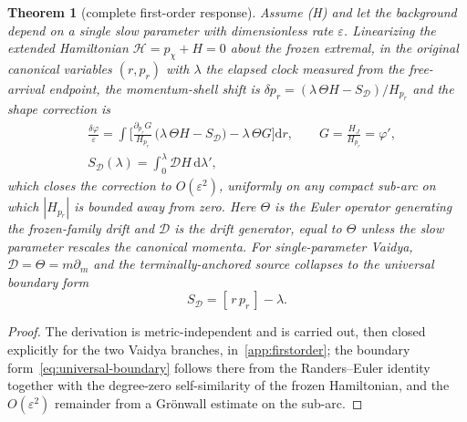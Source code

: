 \documentclass[12pt]{iopart}
\newcommand{\dd}{\mathrm{d}}
\theoremstyle{plain}
\newtheorem{theorem}{Theorem}
\theoremstyle{definition}
\theoremstyle{plain}
\theoremstyle{remark}
\newcommand{\Ithm}[1]{\setcounter{theorem}{\numexpr#1-1\relax}}
\begin{document}
\Ithm{5}
\begin{theorem}[complete first-order response]\label{thm:firstorder}
Assume (H) and let the background depend on a single slow parameter with dimensionless
rate $\varepsilon$. Linearizing the extended Hamiltonian $\mathcal H=p_\chi+H=0$ about the
frozen extremal, in the original canonical variables $(r,p_r)$ with $\lambda$ the elapsed
clock measured from the free-arrival endpoint, the momentum-shell shift is
$\delta p_r=(\lambda\,\Theta H-S_{\mathcal D})/H_{p_r}$ and the shape correction is
\begin{equation}
    \begin{aligned}
    &\frac{\delta\varphi}{\varepsilon}=\int\!\Big[\frac{\partial_{p_r}G}{H_{p_r}}\,
    \big(\lambda\,\Theta H-S_{\mathcal D}\big)-\lambda\,\Theta G\Big]\dd r,\qquad
    G=\frac{H_J}{H_{p_r}}=\varphi',\\[2pt]
    &S_{\mathcal D}(\lambda)=\!\int_0^{\lambda}\!\mathcal D H\,\dd\lambda',
    \end{aligned}
    \label{eq:adiab-exact}
\end{equation}
which closes the correction to $O(\varepsilon^2)$, uniformly on any compact sub-arc on
which $|H_{p_r}|$ is bounded away from zero. Here $\Theta$ is the Euler operator
generating the frozen-family drift and $\mathcal D$ is the drift generator, equal to
$\Theta$ unless the slow parameter rescales the canonical momenta. For single-parameter
Vaidya, $\mathcal D=\Theta=m\partial_m$ and the terminally-anchored source collapses to
the universal boundary form
\begin{equation}
    S_{\mathcal D}=[\,r\,p_r\,]-\lambda .
    \label{eq:universal-boundary}
\end{equation}
\end{theorem}

\begin{proof}
The derivation is metric-independent and is carried out, then closed explicitly for the
two Vaidya branches, in~\ref{app:firstorder}; the boundary form~\eqref{eq:universal-boundary}
follows there from the Randers--Euler identity together with the degree-zero
self-similarity of the frozen Hamiltonian, and the $O(\varepsilon^2)$ remainder from a
Gr\"onwall estimate on the sub-arc.
\end{proof}
\end{document}
